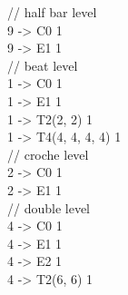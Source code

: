 // half bar level\\
9 -> C0                1\\
9 -> E1                1\\

// beat level\\
1 -> C0                1\\
1 -> E1                1\\
1 -> T2(2, 2)          1\\
1 -> T4(4, 4, 4, 4)    1\\

// croche level\\
2 -> C0                1\\
2 -> E1                1\\

// double level\\
4 -> C0                1\\
4 -> E1                1\\
4 -> E2                1\\
4 -> T2(6, 6)          1\\

